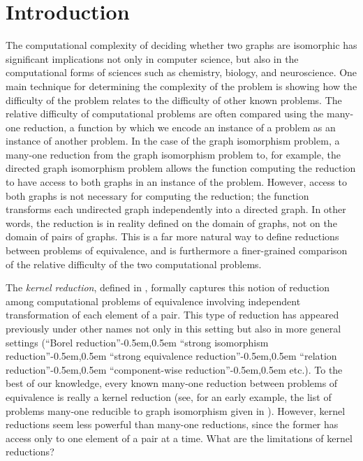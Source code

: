 \section{Introduction}

The computational complexity of deciding whether two graphs are isomorphic has significant implications not only in computer science, but also in the computational forms of sciences such as chemistry, biology, and neuroscience.
One main technique for determining the complexity of the problem is showing how the difficulty of the problem relates to the difficulty of other known problems.
The relative difficulty of computational problems are often compared using the many-one reduction, a function by which we encode an instance of a problem as an instance of another problem.
In the case of the graph isomorphism problem, a many-one reduction from the graph isomorphism problem to, for example, the directed graph isomorphism problem allows the function computing the reduction to have access to both graphs in an instance of the problem.
However, access to both graphs is not necessary for computing the reduction; the function transforms each undirected graph independently into a directed graph.
In other words, the reduction is in reality defined on the domain of graphs, not on the domain of pairs of graphs.
This is a far more natural way to define reductions between problems of equivalence, and is furthermore a finer-grained comparison of the relative difficulty of the two computational problems.

The \emph{kernel reduction}, defined in \autocite[Definition~4.13]{fg11}, formally captures this notion of reduction among computational problems of equivalence involving independent transformation of each element of a pair.
This type of reduction has appeared previously under other names not only in this setting but also in more general settings (``Borel reduction''\kern-0.5em,\kern0.5em ``strong isomorphism reduction''\kern-0.5em,\kern0.5em ``strong equivalence reduction''\kern-0.5em,\kern0.5em ``relation reduction''\kern-0.5em,\kern0.5em ``component-wise reduction''\kern-0.5em,\kern0.5em etc.).
To the best of our knowledge, every known many-one reduction between problems of equivalence is really a kernel reduction (see, for an early example, the list of problems many-one reducible to graph isomorphism given in \autocite{bc79}).
However, kernel reductions seem less powerful than many-one reductions, since the former has access only to one element of a pair at a time.
What are the limitations of kernel reductions?

